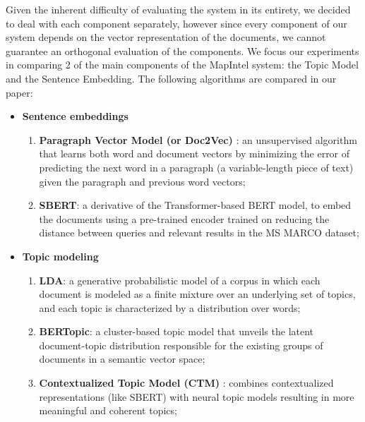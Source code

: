\documentclass[a4paper]{article}
\begin{document}
Given the inherent difficulty of evaluating the system in its entirety, we decided to deal with each component separately, however since every component of our system depends on the vector representation of the documents, we cannot guarantee an orthogonal evaluation of the components. We focus our experiments in comparing 2 of the main components of the MapIntel system: the Topic Model and the Sentence Embedding. The following algorithms are compared in our paper:
\begin{itemize}
	\item \textbf{Sentence embeddings}
	      \begin{enumerate}
		      \item \textbf{Paragraph Vector Model (or Doc2Vec)} \citep{le2014}: an unsupervised algorithm that learns both word and document vectors by minimizing the error of predicting the next word in a paragraph (a variable-length piece of text) given the paragraph and previous word vectors;
		      \item \textbf{SBERT}: a derivative of the Transformer-based BERT model, to embed the documents using a pre-trained encoder trained on reducing the distance between queries and relevant results in the MS MARCO dataset;
	      \end{enumerate}
	\item \textbf{Topic modeling}
	      \begin{enumerate}
		      \item \textbf{LDA}: a generative probabilistic model of a corpus in which each document is modeled as a finite mixture over an underlying set of topics, and each topic is characterized by a distribution over words;
		      \item \textbf{BERTopic}: a cluster-based topic model that unveils the latent document-topic distribution responsible for the existing groups of documents in a semantic vector space;
		      \item \textbf{Contextualized Topic Model (CTM)} \citep{bianchi2021}: combines contextualized representations (like SBERT) with neural topic models resulting in more meaningful and coherent topics;
	      \end{enumerate}
\end{itemize}
\end{document}
